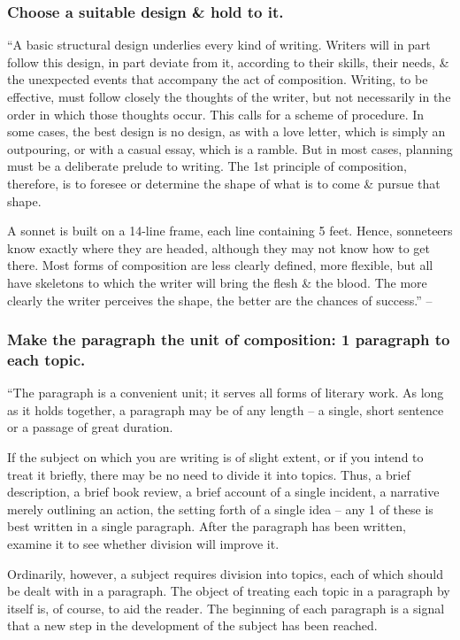 \documentclass{article}
\begin{document}
\subsubsection{Choose a suitable design \& hold to it.}
``A basic structural design underlies every kind of writing. Writers will in part follow this design, in part deviate from it, according to their skills, their needs, \& the unexpected events that accompany the act of composition. Writing, to be effective, must follow closely the thoughts of the writer, but not necessarily in the order in which those thoughts occur. This calls for a scheme of procedure. In some cases, the best design is no design, as with a love letter, which is simply an outpouring, or with a casual essay, which is a ramble. But in most cases, planning must be a deliberate prelude to writing. The 1st principle of composition, therefore, is to foresee or determine the shape of what is to come \& pursue that shape.

A sonnet is built on a 14-line frame, each line containing 5 feet. Hence, sonneteers know exactly where they are headed, although they may not know how to get there. Most forms of composition are less clearly defined, more flexible, but all have skeletons to which the writer will bring the flesh \& the blood. The more clearly the writer perceives the shape, the better are the chances of success.'' -- \cite[p. 29]{Strunk_White_element_style}


\subsubsection{Make the paragraph the unit of composition: 1 paragraph to each topic.}
``The paragraph is a convenient unit; it serves all forms of literary work. As long as it holds together, a paragraph may be of any length -- a single, short sentence or a passage of great duration.

If the subject on which you are writing is of slight extent, or if you intend to treat it briefly, there may be no need to divide it into topics. Thus, a brief description, a brief book review, a brief account of a single incident, a narrative merely outlining an action, the setting forth of a single idea -- any 1 of these is best written in a single paragraph. After the paragraph has been written, examine it to see whether division will improve it.

Ordinarily, however, a subject requires division into topics, each of which should be dealt with in a paragraph. The object of treating each topic in a paragraph by itself is, of course, to aid the reader. The beginning of each paragraph is a signal that a new step in the development of the subject has been reached.
\end{document}
